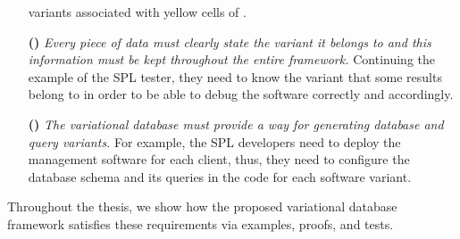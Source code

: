 \begin{enumerate}
 variants associated with yellow cells of . 
%
%
%
\item [\textbf{(\nTwo)}]
\emph{Every piece of data must clearly state the variant it belongs to and 
this information must be kept throughout the entire framework.}
Continuing the example of the SPL tester, they need to know the variant that
some results belong to in order to be able to debug the software correctly and
accordingly. 
%
%
%
\item [\textbf{(\nThree)}]
\emph{The variational database must provide a way for generating database
and query variants.}
For example, the SPL developers need to deploy the management software for each client,
thus, they need to configure the database schema and its queries in the code 
for each software variant.  
%
%
%
\end{enumerate}

Throughout the thesis,
we show how the proposed variational database framework satisfies these requirements 
via examples, proofs, and tests.


